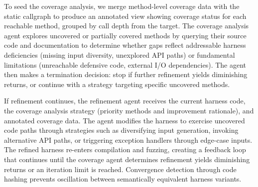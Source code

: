 To seed the coverage analysis, we merge method-level coverage data with the static callgraph to produce an annotated view showing coverage status for each reachable method, grouped by call depth from the target. The coverage analysis agent explores uncovered or partially covered methods by querying their source code and documentation to determine whether gaps reflect addressable harness deficiencies (missing input diversity, unexplored API paths) or fundamental limitations (unreachable defensive code, external I/O dependencies). The agent then makes a termination decision: stop if further refinement yields diminishing returns, or continue with a strategy targeting specific uncovered methods.

If refinement continues, the refinement agent receives the current harness code, the coverage analysis strategy (priority methods and improvement rationale), and annotated coverage data. The agent modifies the harness to exercise uncovered code paths through strategies such as diversifying input generation, invoking alternative API paths, or triggering exception handlers through edge-case inputs. The refined harness re-enters compilation and fuzzing, creating a feedback loop that continues until the coverage agent determines refinement yields diminishing returns or an iteration limit is reached. Convergence detection through code hashing prevents oscillation between semantically equivalent harness variants.

